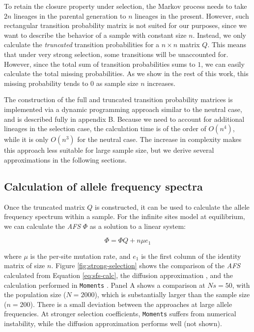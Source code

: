 \documentclass[review]{elsarticle}
\begin{document}
To retain the closure property under selection, the Markov process needs to take $2n$ lineages in
the parental generation to $n$ lineages in the present. However, such rectangular transition
probability matrix is not suited for our purposes, since we want to describe the behavior of a
sample with constant size $n$. Instead, we only calculate the \textit{truncated} transition
probabilities for a $n \times n$ matrix $Q$. This means that under very strong selection, some
transitions will be unaccounted for. However, since the total sum of transition probabilities sums
to $1$, we can easily calculate the total missing probabilities. As we show in the rest of this
work, this missing probability tends to $0$ as sample size $n$ increases.

The construction of the full and truncated transition probability matrices is implemented via a
dynamic programming approach similar to the neutral case, and is described fully in
appendix B. Because we need to account for additional lineages in the selection case, the
calculation time is of the order of $O(n^4)$, while it is only $O(n^3)$ for the neutral case. The
increase in complexity makes this approach less suitable for large sample size, but we derive
several approximations in the following sections.

\subsection{Calculation of allele frequency spectra}
\label{subsec:afs}

Once the truncated matrix $Q$ is constructed, it can be used to calculate the allele frequency
spectrum within a sample. For the infinite sites model at equilibrium, we can calculate the
\textit{AFS} $\Phi$ as a solution to a linear system:

\begin{equation}
  \label{eq:sfs-calc}
\Phi = \Phi Q + n \mu e_1
\end{equation}

where $\mu$ is the per-site mutation rate, and $e_1$ is the first column of the identity matrix of
size $n$. Figure \ref{fig:strong-selection} shows the comparison of the \textit{AFS} calculated from
Equation \eqref{eq:sfs-calc}, the diffusion approximation \cite[eq. 9.23]{Ewens2004}, and the
calculation performed in \texttt{Moments} \cite{JouganousEtAl2017}. Panel A shows a comparison at
$Ns=50$, with the population size ($N=2000$), which is substantially larger than the sample size
($n=200$). There is a small deviation between the approaches at large allele frequencies. At
stronger selection coefficients, \texttt{Moments} suffers from numerical instability, while the
diffusion approximation performs well (not shown).
\end{document}
